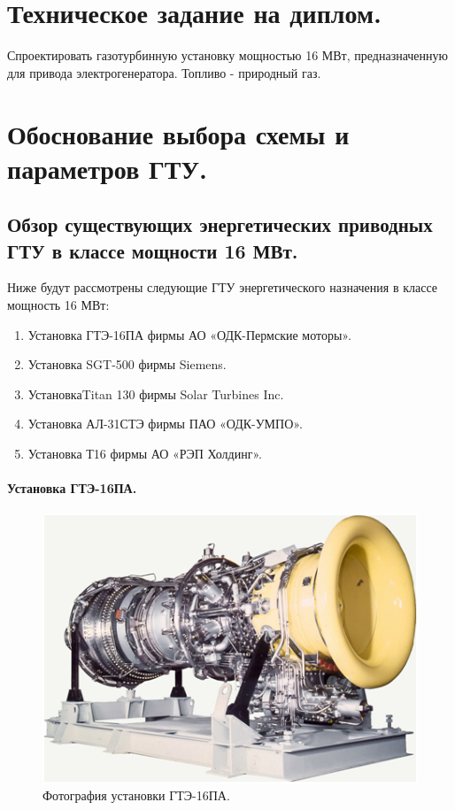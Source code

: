 \documentclass[a4paper,12pt]{article}
\begin{document}
    \section{Техническое задание на диплом.}
    Спроектировать газотурбинную установку мощностью 16 МВт, предназначенную для
    привода электрогенератора.
    Топливо - природный газ.

    \newpage

    \section{Обоснование выбора схемы и параметров ГТУ.}

    \subsection{Обзор существующих энергетических приводных ГТУ в классе мощности 16 МВт.}

     Ниже будут рассмотрены следующие ГТУ энергетического назначения в классе мощность 16 МВт:
    \begin{enumerate}
        \item Установка ГТЭ-16ПА фирмы АО «ОДК-Пермские моторы».
        \item Установка SGT-500 фирмы Siemens.
        \item УстановкаTitan 130 фирмы Solar Turbines Inc.
        \item Установка АЛ-31СТЭ фирмы ПАО «ОДК-УМПО».
        \item Установка Т16 фирмы АО «РЭП Холдинг».
    \end{enumerate}

    \paragraph{Установка ГТЭ-16ПА.}

    \begin{figure}[h!]
        \centering
        \includegraphics[scale=1]{./pictures/GTE-16PA.png}
        \caption{Фотография установки ГТЭ-16ПА.}
        \label{pic_gte_16pa}
    \end{figure}
\end{document}
